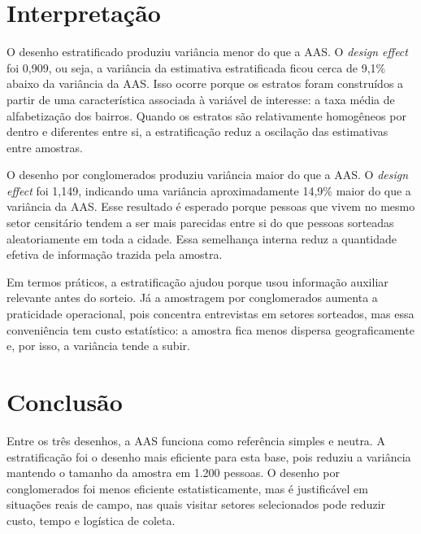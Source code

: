 \documentclass[11pt,a4paper]{article}
\begin{document}
\section*{Interpretação}

O desenho estratificado produziu variância menor do que a AAS. O \textit{design effect} foi 0,909, ou seja, a variância da estimativa estratificada ficou cerca de 9,1\% abaixo da variância da AAS. Isso ocorre porque os estratos foram construídos a partir de uma característica associada à variável de interesse: a taxa média de alfabetização dos bairros. Quando os estratos são relativamente homogêneos por dentro e diferentes entre si, a estratificação reduz a oscilação das estimativas entre amostras.

O desenho por conglomerados produziu variância maior do que a AAS. O \textit{design effect} foi 1,149, indicando uma variância aproximadamente 14,9\% maior do que a variância da AAS. Esse resultado é esperado porque pessoas que vivem no mesmo setor censitário tendem a ser mais parecidas entre si do que pessoas sorteadas aleatoriamente em toda a cidade. Essa semelhança interna reduz a quantidade efetiva de informação trazida pela amostra.

Em termos práticos, a estratificação ajudou porque usou informação auxiliar relevante antes do sorteio. Já a amostragem por conglomerados aumenta a praticidade operacional, pois concentra entrevistas em setores sorteados, mas essa conveniência tem custo estatístico: a amostra fica menos dispersa geograficamente e, por isso, a variância tende a subir.

\newpage

\section*{Conclusão}

Entre os três desenhos, a AAS funciona como referência simples e neutra. A estratificação foi o desenho mais eficiente para esta base, pois reduziu a variância mantendo o tamanho da amostra em 1.200 pessoas. O desenho por conglomerados foi menos eficiente estatisticamente, mas é justificável em situações reais de campo, nas quais visitar setores selecionados pode reduzir custo, tempo e logística de coleta.
\end{document}
